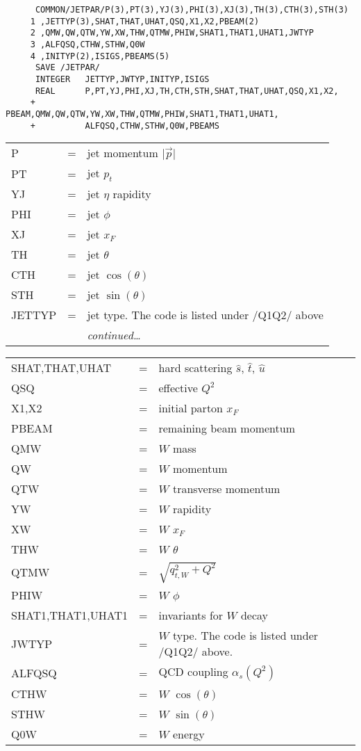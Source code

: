 \begin{verbatim}
      COMMON/JETPAR/P(3),PT(3),YJ(3),PHI(3),XJ(3),TH(3),CTH(3),STH(3)
     1 ,JETTYP(3),SHAT,THAT,UHAT,QSQ,X1,X2,PBEAM(2)
     2 ,QMW,QW,QTW,YW,XW,THW,QTMW,PHIW,SHAT1,THAT1,UHAT1,JWTYP
     3 ,ALFQSQ,CTHW,STHW,Q0W
     4 ,INITYP(2),ISIGS,PBEAMS(5)
      SAVE /JETPAR/
      INTEGER   JETTYP,JWTYP,INITYP,ISIGS
      REAL      P,PT,YJ,PHI,XJ,TH,CTH,STH,SHAT,THAT,UHAT,QSQ,X1,X2,
     +          PBEAM,QMW,QW,QTW,YW,XW,THW,QTMW,PHIW,SHAT1,THAT1,UHAT1,
     +          ALFQSQ,CTHW,STHW,Q0W,PBEAMS
\end{verbatim}
\begin{tabular}{lcl}
P                  &=& jet momentum $\vert\vec p\vert$\\
PT                 &=& jet $p_t$\\
YJ                 &=& jet $\eta$ rapidity\\
PHI                &=& jet $\phi$\\
XJ                 &=& jet $x_F$\\
TH                 &=& jet $\theta$\\
CTH                &=& jet $\cos(\theta)$\\
STH                &=& jet $\sin(\theta)$\\
JETTYP             &=& jet type. The code is listed under /Q1Q2/ above\\
                   &&  {\it continued\dots}\\
\end{tabular}

\begin{tabular}{lcl}
SHAT,THAT,UHAT     &=& hard scattering $\hat s$, $\hat t$, $\hat u$\\
QSQ                &=& effective $Q^2$\\
X1,X2              &=& initial parton $x_F$\\
PBEAM              &=& remaining beam momentum\\
QMW                &=& $W$ mass\\
QW                 &=& $W$ momentum\\
QTW                &=& $W$ transverse momentum\\
YW                 &=& $W$ rapidity\\
XW                 &=& $W$ $x_F$\\
THW                &=& $W$ $\theta$\\
QTMW               &=& $\sqrt{q_{t,W}^2+Q^2}$\\
PHIW               &=& $W$ $\phi$\\
SHAT1,THAT1,UHAT1  &=& invariants for $W$ decay\\
JWTYP              &=& $W$ type. The code is listed under /Q1Q2/ above.\\
ALFQSQ             &=& QCD coupling $\alpha_s(Q^2)$\\
CTHW               &=& $W$ $\cos(\theta)$\\
STHW               &=& $W$ $\sin(\theta)$\\
Q0W                &=& $W$ energy\\
\end{tabular}

